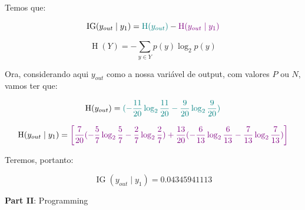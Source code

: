 \documentclass[12pt]{article}
\begin{document}
\begin{enumerate}[leftmargin=\labelsep]
Temos que:

\begin{equation}
  \operatorname{IG}(y_{out} \mid y_1) = \textcolor{teal}{\operatorname{H}(y_{out})} - \textcolor{violet}{\operatorname{H}(y_{out} \mid y_1)}
\end{equation}

\begin{equation}
  \operatorname{H}(Y) = -\sum_{y \in Y} p(y) \log_2 p(y)
\end{equation}

Ora, considerando aqui $y_{out}$ como a nossa variável de output, com valores $P$ ou $N$, vamos ter que:

\begin{equation}
  \operatorname{H}(y_{out}) = \textcolor{teal}{(- \frac{11}{20} \log_2 \frac{11}{20} - \frac{9}{20} \log_2 \frac{9}{20})}
\end{equation}

\begin{equation}
  \operatorname{H}(y_{out} \mid y_1) = \textcolor{violet}{\left[\frac{7}{20}(- {\frac{5}{7}} \log_2 \frac{5}{7} - \frac{2}{7} \log_2 \frac{2}{7}) + \frac{13}{20}(- \frac{6}{13} \log_2 \frac{6}{13} - \frac{7}{13} \log_2 \frac{7}{13})\right]}
\end{equation}

Teremos, portanto:

$$
\operatorname{IG}(y_{out} \mid y_1) = 0.04345941113
$$

\end{enumerate}

\center\large{\textbf{Part II}: Programming}
\end{document}
